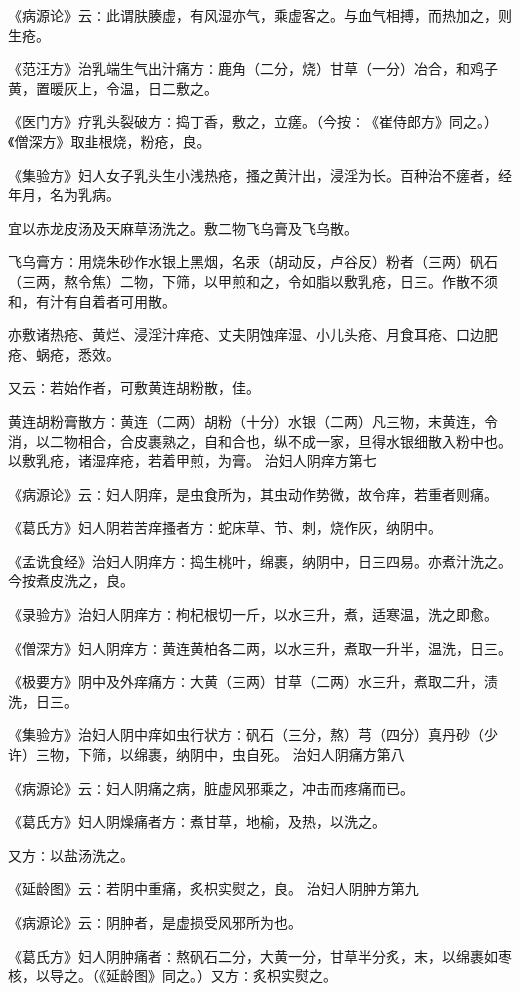 \documentclass[a4paper,12pt,UTF8,twoside]{ctexbook}
\begin{document}
《病源论》云∶此谓肤腠虚，有风湿亦气，乘虚客之。与血气相搏，而热加之，则生疮。

《范汪方》治乳端生气出汁痛方∶鹿角（二分，烧）甘草（一分）冶合，和鸡子黄，置暖灰上，令温，日二敷之。

《医门方》疗乳头裂破方∶捣丁香，敷之，立瘥。（今按∶《崔侍郎方》同之。）《僧深方》取韭根烧，粉疮，良。

《集验方》妇人女子乳头生小浅热疮，搔之黄汁出，浸淫为长。百种治不瘥者，经年月，名为乳病。

宜以赤龙皮汤及天麻草汤洗之。敷二物飞乌膏及飞乌散。

飞乌膏方∶用烧朱砂作水银上黑烟，名汞（胡动反，卢谷反）粉者（三两）矾石（三两，熬令焦）二物，下筛，以甲煎和之，令如脂以敷乳疮，日三。作散不须和，有汁有自着者可用散。

亦敷诸热疮、黄烂、浸淫汁痒疮、丈夫阴蚀痒湿、小儿头疮、月食耳疮、口边肥疮、蜗疮，悉效。

又云∶若始作者，可敷黄连胡粉散，佳。

黄连胡粉膏散方∶黄连（二两）胡粉（十分）水银（二两）凡三物，末黄连，令消，以二物相合，合皮裹熟之，自和合也，纵不成一家，旦得水银细散入粉中也。以敷乳疮，诸湿痒疮，若着甲煎，为膏。
治妇人阴痒方第七

《病源论》云∶妇人阴痒，是虫食所为，其虫动作势微，故令痒，若重者则痛。

《葛氏方》妇人阴若苦痒搔者方∶蛇床草、节、刺，烧作灰，纳阴中。

《孟诜食经》治妇人阴痒方∶捣生桃叶，绵裹，纳阴中，日三四易。亦煮汁洗之。今按煮皮洗之，良。

《录验方》治妇人阴痒方∶枸杞根切一斤，以水三升，煮，适寒温，洗之即愈。

《僧深方》妇人阴痒方∶黄连黄柏各二两，以水三升，煮取一升半，温洗，日三。

《极要方》阴中及外痒痛方∶大黄（三两）甘草（二两）水三升，煮取二升，渍洗，日三。

《集验方》治妇人阴中痒如虫行状方∶矾石（三分，熬）芎（四分）真丹砂（少许）三物，下筛，以绵裹，纳阴中，虫自死。
治妇人阴痛方第八

《病源论》云∶妇人阴痛之病，脏虚风邪乘之，冲击而疼痛而已。

《葛氏方》妇人阴燥痛者方∶煮甘草，地榆，及热，以洗之。

又方∶以盐汤洗之。

《延龄图》云∶若阴中重痛，炙枳实熨之，良。
治妇人阴肿方第九

《病源论》云∶阴肿者，是虚损受风邪所为也。

《葛氏方》妇人阴肿痛者∶熬矾石二分，大黄一分，甘草半分炙，末，以绵裹如枣核，以导之。（《延龄图》同之。）又方∶炙枳实熨之。
\end{document}
